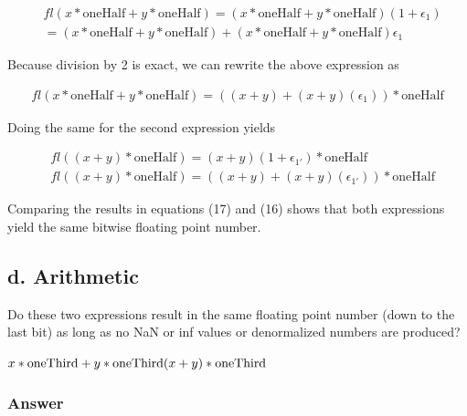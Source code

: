\documentclass{article}
\newcommand{\n}{\newline}
\begin{document}
	\begin{equation}
		\begin{split}
		&fl(x*\text{oneHalf}+y*\text{oneHalf})=(x*\text{oneHalf}+y*\text{oneHalf})(1+\epsilon_{1})\\
		&=(x*\text{oneHalf}+y*\text{oneHalf})+(x*\text{oneHalf}+y*\text{oneHalf})\epsilon_{1}
		\end{split}
	\end{equation}
	
	Because division by 2 is exact, we can rewrite the above expression as
	
	\begin{equation}
		\begin{split}
		fl(x*\text{oneHalf}+y*\text{oneHalf})=((x+y)+(x+y)(\epsilon_{1}))*\text{oneHalf}
		\end{split}
	\end{equation}
	
	Doing the same for the second expression yields
	
	\begin{equation}
		\begin{split}
		&fl((x+y)*\text{oneHalf})=(x+y)(1+\epsilon_{1'})*\text{oneHalf}\\
		&fl((x+y)*\text{oneHalf})=((x+y)+(x+y)(\epsilon_{1'}))*\text{oneHalf}
		\end{split}
	\end{equation}
	
	Comparing the results in equations (17) and (16) shows that both expressions yield the same bitwise floating point number.
	
	\subsection{d. Arithmetic}
	Do these two expressions result in the same floating point number (down to the last bit) as long as no NaN or inf values or denormalized numbers are produced? \n
	
	\begin{flushleft}
	\begin{math}
	x*\text{oneThird}+y*\text{oneThird}\n
	(x+y)*\text{oneThird}
	\end{math}
	\end{flushleft}
	
	\subsubsection{Answer}
	
\end{document}
